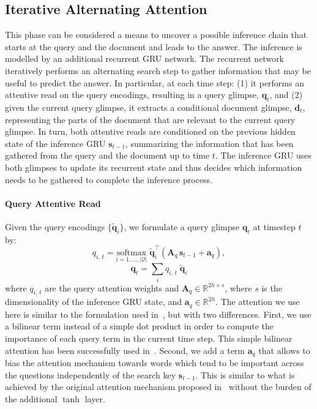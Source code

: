 \documentclass[11pt]{article}
\begin{document}
\subsection{Iterative Alternating Attention}
\label{sec:iterative}
This phase can be considered a means to uncover a possible inference chain that starts at the query and the document and leads to the answer.
The inference is modelled by an additional recurrent GRU network. The recurrent network iteratively performs an alternating search step to gather information that may be useful to predict the answer.
In particular, at each time step: (1) it performs an attentive read on the query encodings, resulting in a query glimpse, $\mathbf{q}_t$, and (2) given the current query glimpse, it extracts a conditional document glimpse, $\mathbf{d}_t$, representing the parts of the document that are relevant to the current query glimpse. In turn, both attentive reads are conditioned on the previous hidden state of the inference GRU $\mathbf{s}_{t-1}$, summarizing the information that has been gathered from the query and the document up to time $t$. The inference GRU uses both glimpses to update its recurrent state and thus decides which information needs to be gathered to complete the inference process.

\paragraph{Query Attentive Read} Given the query encodings $\{\mathbf{\tilde{q}}_i\}$, we formulate a query glimpse $\mathbf{q}_t$ at timestep $t$ by:
\[
q_{i,\, t} = \underset{i=1,\ldots,\mathcal{|Q|}}{\text{softmax}}\; \mathbf{\tilde{q}}_i^\top(\mathbf{A}_q \, \mathbf{s}_{t-1} + \mathbf{a}_q),
\]
\[
\mathbf{q}_t = \sum_i q_{i,\, t}\; \mathbf{\tilde{q}}_i
\]
where $q_{i,\, t}$ are the query attention weights and $\mathbf{A}_q \in \mathbb{R}^{2h \times s}$, where $s$ is the dimensionality of the inference GRU state, and $\mathbf{a}_q \in \mathbb{R}^{2h}$.
The attention we use here is similar to the formulation used in~\cite{hill2015goldilocks,sukhbaatar2015end}, but with two differences. First, we use a bilinear term instead of a simple dot product in order to compute the importance of each query term in the current time step. This simple bilinear attention has been successfully used in~\cite{luong-pham-manning:2015:EMNLP}. Second, we add a term $\mathbf{a}_q$ that allows to bias the attention mechanism towards words which tend to be important across the questions independently of the search key $\mathbf{s}_{t-1}$. This is similar to what is achieved by the original attention mechanism proposed in~\cite{bahdanau2014neural} without the burden of the additional $\tanh$ layer.
\end{document}
